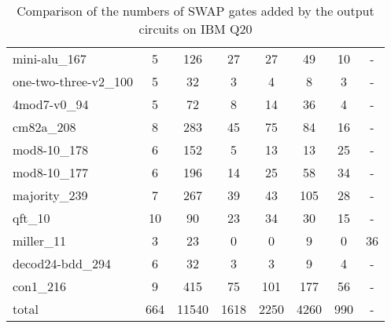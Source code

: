 \documentclass[journal]{IEEEtran}
\begin{document}
\begin{table*}[htbp]
\begin{center}
\begin{tabular}{|p{4.3cm}<{\centering}|c|c|c|c|c|c|c|}
				mini-alu\_167 & 5 & 126 & 27 & 27 & 49 & 10 & - \\ 
				one-two-three-v2\_100 & 5 & 32 & 3 & 4 & 8 & 3 & - \\ 
				4mod7-v0\_94 & 5 & 72 & 8 & 14 & 36 & 4 & - \\ 
				cm82a\_208 & 8 & 283 & 45 & 75 & 84 & 16 & - \\ 
				mod8-10\_178 & 6 & 152 & 5 & 13 & 13 & 25 & - \\ 
				mod8-10\_177 & 6 & 196 & 14 & 25 & 58 & 34 & - \\ 
				majority\_239 & 7 & 267 & 39 & 43 & 105 & 28 & - \\ 
				qft\_10 & 10 & 90 & 23 & 34 & 30 & 15 & - \\ 
				miller\_11 & 3 & 23 & 0 & 0 & 9 & 0 & 36 \\ 
				decod24-bdd\_294 & 6 & 32 & 3 & 3 & 9 & 4 & - \\ 
				con1\_216 & 9 & 415 & 75 & 101 & 177 & 56 & - \\ 
				\hline
				total&664 & 11540 & 1618 & 2250 & 4260 & 990 &-\\
				\hline
			\end{tabular} 
		\end{center} 
		\caption{Comparison of the numbers of SWAP gates added by the 
			output circuits on IBM Q20 } 
		\label{tab4}
	\end{table*}	
	
\end{document}
